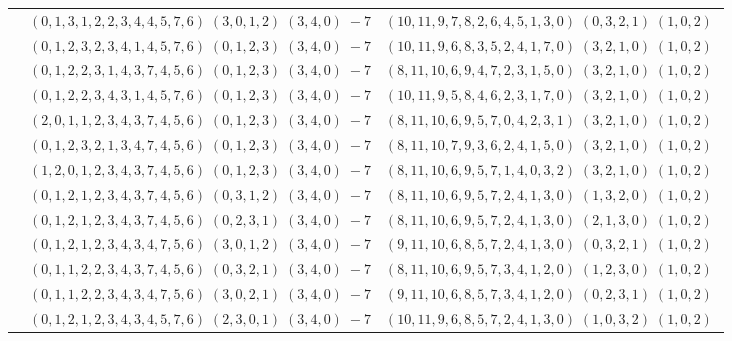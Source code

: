 \documentclass[11pt]{article}
\begin{document}
\begin{longtable}[l]{|c|c|c|}
 \cline{2-3} 
 & $(0 ,1 ,3 ,1 ,2 ,2 ,3 ,4 ,4 ,5 ,7 ,6) \;(3 ,0 ,1 ,2) \;(3 ,4 ,0) \;-7$ & $(10 ,11 ,9 ,7 ,8 ,2 ,6 ,4 ,5 ,1 ,3 ,0) \;(0 ,3 ,2 ,1) \;(1 ,0 ,2) \;$\\ 
 \cline{2-3} 
 & $(0 ,1 ,2 ,3 ,2 ,3 ,4 ,1 ,4 ,5 ,7 ,6) \;(0 ,1 ,2 ,3) \;(3 ,4 ,0) \;-7$ & $(10 ,11 ,9 ,6 ,8 ,3 ,5 ,2 ,4 ,1 ,7 ,0) \;(3 ,2 ,1 ,0) \;(1 ,0 ,2) \;$\\ 
 \cline{2-3} 
 & $(0 ,1 ,2 ,2 ,3 ,1 ,4 ,3 ,7 ,4 ,5 ,6) \;(0 ,1 ,2 ,3) \;(3 ,4 ,0) \;-7$ & $(8 ,11 ,10 ,6 ,9 ,4 ,7 ,2 ,3 ,1 ,5 ,0) \;(3 ,2 ,1 ,0) \;(1 ,0 ,2) \;$\\ 
 \cline{2-3} 
 & $(0 ,1 ,2 ,2 ,3 ,4 ,3 ,1 ,4 ,5 ,7 ,6) \;(0 ,1 ,2 ,3) \;(3 ,4 ,0) \;-7$ & $(10 ,11 ,9 ,5 ,8 ,4 ,6 ,2 ,3 ,1 ,7 ,0) \;(3 ,2 ,1 ,0) \;(1 ,0 ,2) \;$\\ 
 \cline{2-3} 
 & $(2 ,0 ,1 ,1 ,2 ,3 ,4 ,3 ,7 ,4 ,5 ,6) \;(0 ,1 ,2 ,3) \;(3 ,4 ,0) \;-7$ & $(8 ,11 ,10 ,6 ,9 ,5 ,7 ,0 ,4 ,2 ,3 ,1) \;(3 ,2 ,1 ,0) \;(1 ,0 ,2) \;$\\ 
 \cline{2-3} 
 & $(0 ,1 ,2 ,3 ,2 ,1 ,3 ,4 ,7 ,4 ,5 ,6) \;(0 ,1 ,2 ,3) \;(3 ,4 ,0) \;-7$ & $(8 ,11 ,10 ,7 ,9 ,3 ,6 ,2 ,4 ,1 ,5 ,0) \;(3 ,2 ,1 ,0) \;(1 ,0 ,2) \;$\\ 
 \cline{2-3} 
 & $(1 ,2 ,0 ,1 ,2 ,3 ,4 ,3 ,7 ,4 ,5 ,6) \;(0 ,1 ,2 ,3) \;(3 ,4 ,0) \;-7$ & $(8 ,11 ,10 ,6 ,9 ,5 ,7 ,1 ,4 ,0 ,3 ,2) \;(3 ,2 ,1 ,0) \;(1 ,0 ,2) \;$\\ 
 \cline{2-3} 
 & $(0 ,1 ,2 ,1 ,2 ,3 ,4 ,3 ,7 ,4 ,5 ,6) \;(0 ,3 ,1 ,2) \;(3 ,4 ,0) \;-7$ & $(8 ,11 ,10 ,6 ,9 ,5 ,7 ,2 ,4 ,1 ,3 ,0) \;(1 ,3 ,2 ,0) \;(1 ,0 ,2) \;$\\ 
 \cline{2-3} 
 & $(0 ,1 ,2 ,1 ,2 ,3 ,4 ,3 ,7 ,4 ,5 ,6) \;(0 ,2 ,3 ,1) \;(3 ,4 ,0) \;-7$ & $(8 ,11 ,10 ,6 ,9 ,5 ,7 ,2 ,4 ,1 ,3 ,0) \;(2 ,1 ,3 ,0) \;(1 ,0 ,2) \;$\\ 
 \cline{2-3} 
 & $(0 ,1 ,2 ,1 ,2 ,3 ,4 ,3 ,4 ,7 ,5 ,6) \;(3 ,0 ,1 ,2) \;(3 ,4 ,0) \;-7$ & $(9 ,11 ,10 ,6 ,8 ,5 ,7 ,2 ,4 ,1 ,3 ,0) \;(0 ,3 ,2 ,1) \;(1 ,0 ,2) \;$\\ 
 \cline{2-3} 
 & $(0 ,1 ,1 ,2 ,2 ,3 ,4 ,3 ,7 ,4 ,5 ,6) \;(0 ,3 ,2 ,1) \;(3 ,4 ,0) \;-7$ & $(8 ,11 ,10 ,6 ,9 ,5 ,7 ,3 ,4 ,1 ,2 ,0) \;(1 ,2 ,3 ,0) \;(1 ,0 ,2) \;$\\ 
 \cline{2-3} 
 & $(0 ,1 ,1 ,2 ,2 ,3 ,4 ,3 ,4 ,7 ,5 ,6) \;(3 ,0 ,2 ,1) \;(3 ,4 ,0) \;-7$ & $(9 ,11 ,10 ,6 ,8 ,5 ,7 ,3 ,4 ,1 ,2 ,0) \;(0 ,2 ,3 ,1) \;(1 ,0 ,2) \;$\\ 
 \cline{2-3} 
 & $(0 ,1 ,2 ,1 ,2 ,3 ,4 ,3 ,4 ,5 ,7 ,6) \;(2 ,3 ,0 ,1) \;(3 ,4 ,0) \;-7$ & $(10 ,11 ,9 ,6 ,8 ,5 ,7 ,2 ,4 ,1 ,3 ,0) \;(1 ,0 ,3 ,2) \;(1 ,0 ,2) \;$\\ 

\end{longtable}
\end{document}
